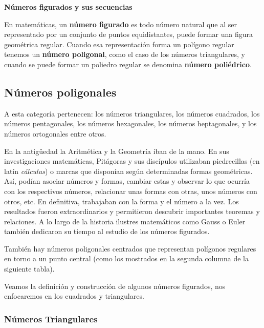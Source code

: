 \documentclass[12pt,a4paper]{article}
\begin{document}
\begin{tcolorbox}[colback=fondorosa,colframe=rojoclaro,title=MINI EXPLICACIÓN: NÚMEROS FIGURADOS Y SUS SECUENCIAS,breakable]

\textbf{Números figurados y sus secuencias}

En matemáticas, un \textbf{número figurado} es todo número natural que al ser representado por un conjunto de puntos equidistantes, puede formar una figura geométrica regular. Cuando esa representación forma un polígono regular tenemos un \textbf{número poligonal}, como el caso de los números triangulares, y cuando se puede formar un poliedro regular se denomina \textbf{número poliédrico}.

\subsection*{Números poligonales}

A esta categoría pertenecen: los números triangulares, los números cuadrados, los números pentagonales, los números hexagonales, los números heptagonales, y los números ortogonales entre otros.

En la antigüedad la Aritmética y la Geometría iban de la mano. En sus investigaciones matemáticas, Pitágoras y sus discípulos utilizaban piedrecillas (en latín \textit{cálculus}) o marcas que disponían según determinadas formas geométricas. Así, podían asociar números y formas, cambiar estas y observar lo que ocurría con los respectivos números, relacionar unas formas con otras, unos números con otros, etc. En definitiva, trabajaban con la forma y el número a la vez. Los resultados fueron extraordinarios y permitieron descubrir importantes teoremas y relaciones. A lo largo de la historia ilustres matemáticos como Gauss o Euler también dedicaron su tiempo al estudio de los números figurados.

También hay números poligonales centrados que representan polígonos regulares en torno a un punto central (como los mostrados en la segunda columna de la siguiente tabla).

Veamos la definición y construcción de algunos números figurados, nos enfocaremos en los cuadrados y triangulares.

\end{tcolorbox}

\subsubsection*{Números Triangulares}
\end{document}
